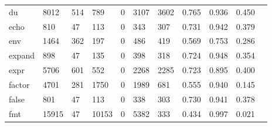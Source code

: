 \begin{longtable}{lp{1.10cm}p{1.10cm}p{1.10cm}p{1.10cm}p{1.10cm}p{1.10cm}p{1.10cm}p{1.10cm}p{1.10cm}p{1.10cm}}
du        &                   8012 &                                514 &                               789 &                                0 &                              3107 &                            3602 &                             0.765 &                                 0.936 &                               0.450 \\
echo      &                    810 &                                 47 &                               113 &                                0 &                               343 &                             307 &                             0.731 &                                 0.942 &                               0.379 \\
env       &                   1464 &                                362 &                               197 &                                0 &                               486 &                             419 &                             0.569 &                                 0.753 &                               0.286 \\
expand    &                    898 &                                 47 &                               135 &                                0 &                               398 &                             318 &                             0.724 &                                 0.948 &                               0.354 \\
expr      &                   5706 &                                601 &                               552 &                                0 &                              2268 &                            2285 &                             0.723 &                                 0.895 &                               0.400 \\
factor    &                   4701 &                                281 &                              1750 &                                0 &                              1989 &                             681 &                             0.555 &                                 0.940 &                               0.145 \\
false     &                    801 &                                 47 &                               113 &                                0 &                               338 &                             303 &                             0.730 &                                 0.941 &                               0.378 \\
fmt       &                  15915 &                                 47 &                             10153 &                                0 &                              5382 &                             333 &                             0.434 &                                 0.997 &                               0.021 \\

\end{longtable}
